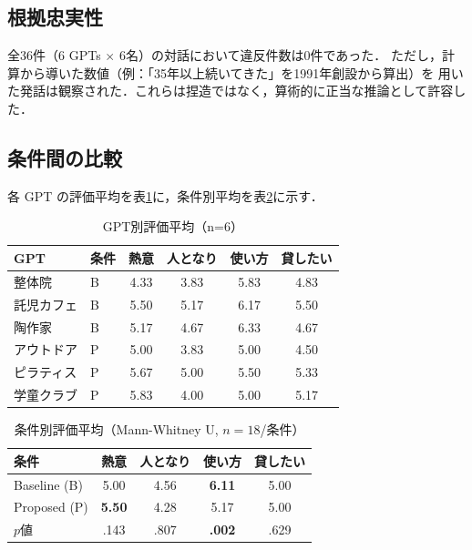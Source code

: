 \documentclass[dvipdfmx]{FITpaper}
\begin{document}
\subsection{根拠忠実性}

全36件（6 GPTs $\times$ 6名）の対話において違反件数は0件であった．
ただし，計算から導いた数値（例：「35年以上続いてきた」を1991年創設から算出）を
用いた発話は観察された．これらは捏造ではなく，算術的に正当な推論として許容した．

\subsection{条件間の比較}

各 GPT の評価平均を表\ref{tab:results_gpt}に，条件別平均を表\ref{tab:results_cond}に示す．

\begin{table}[h]
  \centering
  \caption{GPT別評価平均（n=6）}
  \label{tab:results_gpt}
  \small
  \begin{tabular}{llcccc}
    \toprule
    GPT & 条件 & 熱意 & 人となり & 使い方 & 貸したい \\
    \midrule
    整体院 & B & 4.33 & 3.83 & 5.83 & 4.83 \\
    託児カフェ & B & 5.50 & 5.17 & 6.17 & 5.50 \\
    陶作家 & B & 5.17 & 4.67 & 6.33 & 4.67 \\
    アウトドア & P & 5.00 & 3.83 & 5.00 & 4.50 \\
    ピラティス & P & 5.67 & 5.00 & 5.50 & 5.33 \\
    学童クラブ & P & 5.83 & 4.00 & 5.00 & 5.17 \\
    \bottomrule
  \end{tabular}
\end{table}

\begin{table}[h]
  \centering
  \caption{条件別評価平均（Mann-Whitney U, $n=18$/条件）}
  \label{tab:results_cond}
  \begin{tabular}{p{2.0cm}cccc}
    \toprule
    条件 & 熱意 & 人となり & 使い方 & 貸したい \\
    \midrule
    Baseline (B) & 5.00 & 4.56 & \textbf{6.11} & 5.00 \\
    Proposed (P) & \textbf{5.50} & 4.28 & 5.17 & 5.00 \\
    \midrule
    $p$値 & .143 & .807 & \textbf{.002} & .629 \\
    \bottomrule
  \end{tabular}
\end{table}
\end{document}
